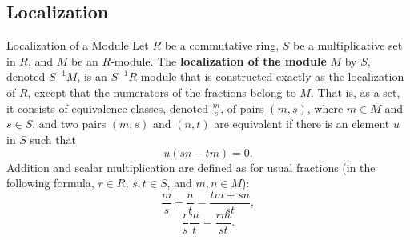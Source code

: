 \subsection{Localization}
\begin{definition}{Localization of a Module}{}
    Let $R$ be a commutative ring, $S$ be a multiplicative set in $R$, and $M$ be an $R$-module. The \textbf{localization of the module} $M$ by $S$, denoted $S^{-1}M$, is an $S^{-1}R$-module that is constructed exactly as the localization of $R$, except that the numerators of the fractions belong to $M$. That is, as a set, it consists of equivalence classes, denoted $\frac{m}{s}$, of pairs $(m, s)$, where $m\in M$ and $s\in S$, and two pairs $(m, s)$ and $(n, t)$ are equivalent if there is an element $u$ in $S$ such that
    \[u(sn-tm)=0.\]
    Addition and scalar multiplication are defined as for usual fractions (in the following formula, $r\in R$, $s,t\in S$, and $m,n\in M$):
    \[\frac{m}{s} + \frac{n}{t} = \frac{tm+sn}{st},\]
    \[\frac{r}{s} \frac{m}{t} = \frac{r m}{st}.\]
\end{definition}



